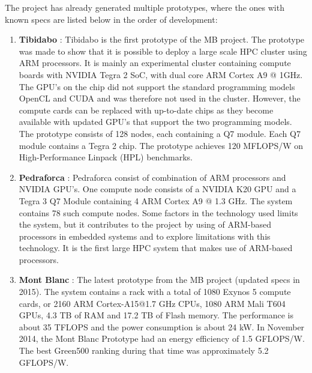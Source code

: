 \noindent
The project has already generated multiple prototypes, where the ones with known specs are listed below in the order of development:
\begin{enumerate}
\item \textbf{Tibidabo} \cite{a:MB:Tib}: Tibidabo is the first prototype of the MB project. The prototype was made to show that it is possible to deploy a large scale HPC cluster using ARM processors. It is mainly an experimental cluster containing compute boards with NVIDIA Tegra 2 SoC, with dual core ARM Cortex A9 @ 1GHz. The GPU's on the chip did not support the standard programming models OpenCL and CUDA and was therefore not used in the cluster. However, the compute cards can be replaced with up-to-date chips as they become available with updated GPU's that support the two programming models. The prototype consists of 128 nodes, each containing a Q7 module. Each Q7 module contains a Tegra 2 chip. The prototype achieves 120 MFLOPS/W on High-Performance Linpack (HPL) benchmarks.
\item \textbf{Pedraforca} \cite{m:MB:Pedr}: Pedraforca consist of combination of ARM processors and NVIDIA GPU's. One compute node consists of a NVIDIA K20 GPU and a Tegra 3 Q7 Module containing 4 ARM Cortex A9 @ 1.3 GHz. The system contains 78 such compute nodes. Some factors in the technology used limits the system, but it contributes to the project by using of ARM-based processors in embedded systems and to explore limitations with this technology. It is the first large HPC system that makes use of ARM-based processors.
\item \textbf{Mont Blanc} \cite{m:MB:MB-prot}: The latest prototype from the MB project (updated specs in 2015\cite{m:MB-15}). The system contains a rack with a total of 1080 Exynos 5 compute cards, or  2160 ARM Cortex-A15@1.7 GHz CPUs, 1080 ARM Mali T604 GPUs, 4.3 TB of RAM and 17.2 TB of Flash memory. The performance is about 35 TFLOPS and the power consumption is about 24 kW. In November 2014, the Mont Blanc Prototype had an energy efficiency of 1.5 GFLOPS/W. The best Green500 ranking during that time was approximately 5.2 GFLOPS/W.
\end{enumerate}


